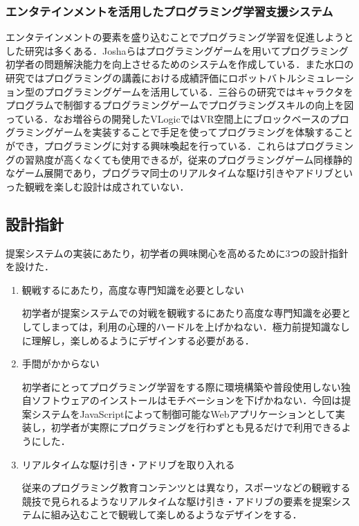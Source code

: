 \subsubsection{エンタテインメントを活用したプログラミング学習支援システム}
エンタテインメントの要素を盛り込むことでプログラミング学習を促進しようとした研究は多くある．Joshaらはプログラミングゲームを用いてプログラミング初学者の問題解決能力を向上させるためのシステムを作成している\cite{joshua}．また水口の研究ではプログラミングの講義における成績評価にロボットバトルシミュレーション型のプログラミングゲームを活用している\cite{minakuchi}．三谷らの研究ではキャラクタをプログラムで制御するプログラミングゲームでプログラミングスキルの向上を図っている\cite{mitani}．なお増谷らの開発したVLogic\cite{mashitani}ではVR空間上にブロックベースのプログラミングゲームを実装することで手足を使ってプログラミングを体験することができ，プログラミングに対する興味喚起を行っている．これらはプログラミングの習熟度が高くなくても使用できるが，従来のプログラミングゲーム同様静的なゲーム展開であり，プログラマ同士のリアルタイムな駆け引きやアドリブといった観戦を楽しむ設計は成されていない．



\subsection{設計指針}

提案システムの実装にあたり，初学者の興味関心を高めるために3つの設計指針を設けた．

\begin{enumerate}
	\item 観戦するにあたり，高度な専門知識を必要としない
	
	初学者が提案システムでの対戦を観戦するにあたり高度な専門知識を必要としてしまっては，利用の心理的ハードルを上げかねない．極力前提知識なしに理解し，楽しめるようにデザインする必要がある．
	
	\item 手間がかからない

	初学者にとってプログラミング学習をする際に環境構築や普段使用しない独自ソフトウェアのインストールはモチベーションを下げかねない．今回は提案システムをJavaScriptによって制御可能なWebアプリケーションとして実装し，初学者が実際にプログラミングを行わずとも見るだけで利用できるようにした．
	
	\item リアルタイムな駆け引き・アドリブを取り入れる

	従来のプログラミング教育コンテンツとは異なり，スポーツなどの観戦する競技で見られるようなリアルタイムな駆け引き・アドリブの要素を提案システムに組み込むことで観戦して楽しめるようなデザインをする．
\end{enumerate}

